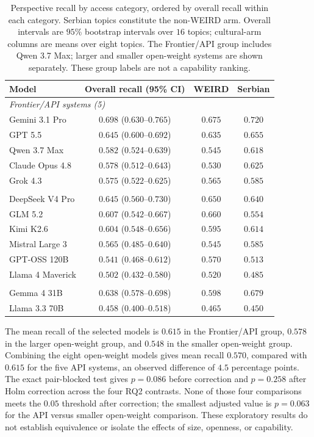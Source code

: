 \documentclass[11pt,a4paper]{article}
\begin{document}
\begin{table}[!t]
\centering
\small
\caption{Perspective recall by access category, ordered by overall recall within each category. Serbian topics constitute the non-WEIRD arm. Overall intervals are $95$\% bootstrap intervals over $16$ topics; cultural-arm columns are means over eight topics. The Frontier/API group includes Qwen 3.7 Max; larger and smaller open-weight systems are shown separately. These group labels are not a capability ranking.}
\label{tab:model-recall}
\begin{tabular}{lccc}
\toprule
Model & Overall recall (95\% CI) & WEIRD & Serbian \\
\midrule
\multicolumn{4}{l}{\textit{Frontier/API systems (5)}}\\
Gemini 3.1 Pro & $0.698$ ($0.630$--$0.765$) & $0.675$ & $0.720$\\
GPT 5.5 & $0.645$ ($0.600$--$0.692$) & $0.635$ & $0.655$\\
Qwen 3.7 Max & $0.582$ ($0.524$--$0.639$) & $0.545$ & $0.618$\\
Claude Opus 4.8 & $0.578$ ($0.512$--$0.643$) & $0.530$ & $0.625$\\
Grok 4.3 & $0.575$ ($0.522$--$0.625$) & $0.565$ & $0.585$\\
\addlinespace
\multicolumn{4}{l}{\textit{Larger open-weight systems (6)}}\\
DeepSeek V4 Pro & $0.645$ ($0.560$--$0.730$) & $0.650$ & $0.640$\\
GLM 5.2 & $0.607$ ($0.542$--$0.667$) & $0.660$ & $0.554$\\
Kimi K2.6 & $0.604$ ($0.548$--$0.656$) & $0.595$ & $0.614$\\
Mistral Large 3 & $0.565$ ($0.485$--$0.640$) & $0.545$ & $0.585$\\
GPT-OSS 120B & $0.541$ ($0.468$--$0.612$) & $0.570$ & $0.513$\\
Llama 4 Maverick & $0.502$ ($0.432$--$0.580$) & $0.520$ & $0.485$\\
\addlinespace
\multicolumn{4}{l}{\textit{Smaller open-weight systems (2)}}\\
Gemma 4 31B & $0.638$ ($0.578$--$0.698$) & $0.598$ & $0.679$\\
Llama 3.3 70B & $0.458$ ($0.400$--$0.518$) & $0.465$ & $0.450$\\
\bottomrule
\end{tabular}
\end{table}

The mean recall of the selected models is $0.615$ in the Frontier/API group, $0.578$ in the larger open-weight group, and $0.548$ in the smaller open-weight group. Combining the eight open-weight models gives mean recall $0.570$, compared with $0.615$ for the five API systems, an observed difference of $4.5$ percentage points. The exact pair-blocked test gives $p=0.086$ before correction and $p=0.258$ after Holm correction across the four RQ2 contrasts. None of those four comparisons meets the $0.05$ threshold after correction; the smallest adjusted value is $p=0.063$ for the API versus smaller open-weight comparison. These exploratory results do not establish equivalence or isolate the effects of size, openness, or capability.
\end{document}
